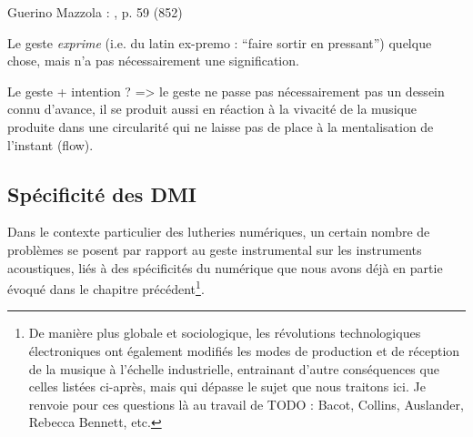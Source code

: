 




Guerino Mazzola :  \cite{mazzola_topos_2018}, p. 59 (852)

Le geste \textit{exprime} (i.e. du latin ex-premo : ``faire sortir en pressant'') quelque chose, mais n'a pas nécessairement une signification.


Le geste + intention ? => le geste ne passe pas nécessairement pas un dessein connu d'avance, il se produit aussi en réaction à la vivacité de la musique produite dans une circularité qui ne laisse pas de place à la mentalisation de l'instant (flow).

\subsection{Spécificité des DMI}
Dans le contexte particulier des lutheries numériques, un certain nombre de problèmes se posent par rapport au geste instrumental sur les instruments acoustiques, liés à des spécificités du numérique que nous avons déjà en partie évoqué dans le chapitre précédent\footnote{De manière plus globale et sociologique, les révolutions technologiques électroniques ont également modifiés les modes de production et de réception de la musique à l'échelle industrielle, entrainant d'autre conséquences que celles listées ci-après, mais qui dépasse le sujet que nous traitons ici. Je renvoie pour ces questions là au travail de TODO : Bacot, Collins, Auslander, Rebecca Bennett, etc.}.

